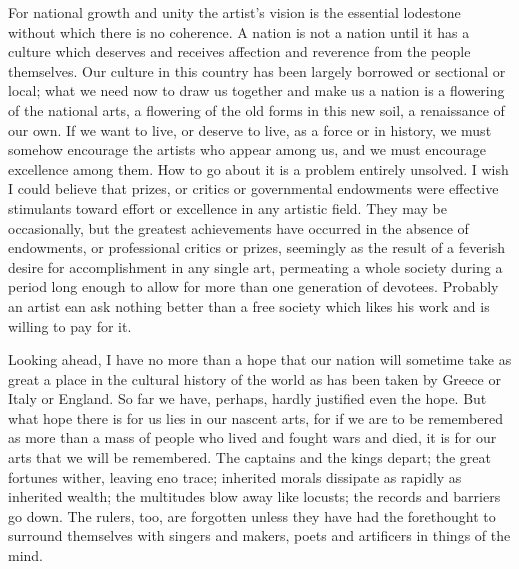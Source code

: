 \documentclass[9pt,twoside]{extarticle}
\begin{document}
For national growth and unity the artist's vision is the essential lodestone without which there is no coherence. A nation is not a nation until it has a culture which deserves and receives affection and reverence from the people themselves. Our culture in this country has been largely borrowed or sectional or local; what we need now to draw us together and make us a nation is a flowering of the national arts, a flowering of the old forms in this new soil, a renaissance of our own. If we want to live, or deserve to live, as a force or in history, we must somehow encourage the artists who appear among us, and we must encourage excellence among them. How to go about it is a problem entirely unsolved. I wish I could believe that prizes, or critics or governmental endowments were effective stimulants toward effort or excellence in any artistic field. They may be occasionally, but the greatest achievements have occurred in the absence of endowments, or professional critics or prizes, seemingly as the result of a feverish desire for accomplishment in any single art, permeating a whole society during a period long enough to allow for more than one generation of devotees. Probably an artist ean ask nothing better than a free society which likes his work and is willing to pay for it.

Looking ahead, I have no more than a hope that our nation will sometime take as great a place in the cultural history of the world as has been taken by Greece or Italy or England. So far we have, perhaps, hardly justified even the hope. But what hope there is for us lies in our nascent arts, for if we are to be remembered as more than a mass of people who lived and fought wars and died, it is for our arts that we will be remembered. The captains and the kings depart; the great fortunes wither, leaving eno trace; inherited morals dissipate as rapidly as inherited wealth; the multitudes blow away like locusts; the records and barriers go down. The rulers, too, are forgotten unless they have had the forethought to surround themselves with singers and makers, poets and artificers in things of the mind.
\end{document}
